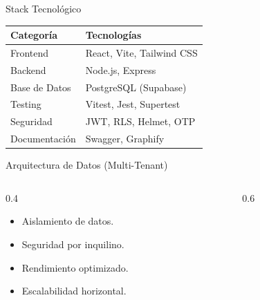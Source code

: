 \documentclass[aspectratio=169]{beamer}
\begin{document}
\begin{frame}{Stack Tecnológico}
    \centering
    \renewcommand{\arraystretch}{1.6}
    \begin{tabular}{@{}ll@{}}
        \toprule
        \textbf{Categoría} & \textbf{Tecnologías} \\
        \midrule
        \textcolor{AzulMedio}{Frontend} & React, Vite, Tailwind CSS \\
        \textcolor{AzulMedio}{Backend} & Node.js, Express \\
        \textcolor{AzulMedio}{Base de Datos} & PostgreSQL (Supabase) \\
        \textcolor{AzulMedio}{Testing} & Vitest, Jest, Supertest \\
        \textcolor{AzulMedio}{Seguridad} & JWT, RLS, Helmet, OTP \\
        \textcolor{AzulMedio}{Documentación} & Swagger, Graphify \\
        \bottomrule
    \end{tabular}
\end{frame}

\begin{frame}{Arquitectura de Datos (Multi-Tenant)}
    \begin{columns}[T]
        \begin{column}{0.4\textwidth}
            \vspace{1cm}
            \begin{itemize}
                \item Aislamiento de datos.
                \item Seguridad por inquilino.
                \item Rendimiento optimizado.
                \item Escalabilidad horizontal.
            \end{itemize}
        \end{column}
        \begin{column}{0.6\textwidth}
            \centering
        \end{column}
    \end{columns}
\end{frame}
\end{document}
